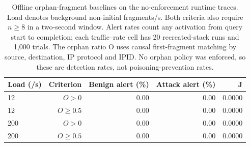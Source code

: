 \begin{table}[t]
\centering
\caption{Offline orphan-fragment baselines on the no-enforcement runtime traces. Load denotes background non-initial fragments/s. Both criteria also require $n\geq8$ in a two-second window. Alert rates count any activation from query start to completion; each traffic--rate cell has 20 recreated-stack runs and 1,000 trials. The orphan ratio O uses causal first-fragment matching by source, destination, IP protocol and IPID. No orphan policy was enforced, so these are detection rates, not poisoning-prevention rates.}
\label{tab:orphan-baseline}
\begingroup\fontsize{9}{10.8}\selectfont
\setlength{\tabcolsep}{2pt}
\begin{tabular}{lrrrr}
\hline
Load (/s) & Criterion & Benign alert (\%) & Attack alert (\%) & J \\
\hline
12 & $O>0$ & 0.00 & 0.00 & 0.0000 \\
12 & $O\geq0.5$ & 0.00 & 0.00 & 0.0000 \\
200 & $O>0$ & 0.00 & 0.00 & 0.0000 \\
200 & $O\geq0.5$ & 0.00 & 0.00 & 0.0000 \\
\hline
\end{tabular}
\endgroup
\end{table}
